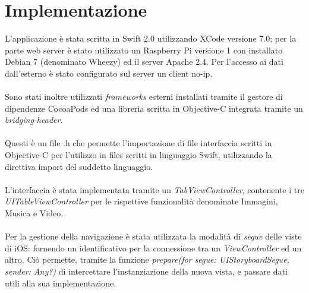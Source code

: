 \section{Implementazione}
L'applicazione è stata scritta in Swift 2.0 utilizzando XCode versione 7.0; per la parte web server è stato utilizzato un Raspberry Pi versione 1 con installato Debian 7 (denominato Wheezy) ed il server Apache 2.4. Per l'accesso ai dati dall'esterno è stato configurato sul server un client no-ip.\\\\
Sono stati inoltre utilizzati \textit{frameworks} esterni installati tramite il gestore di dipendenze CocoaPods ed una libreria scritta in Objective-C integrata tramite un \textit{bridging-header}.\\\\
Questi è un file .h che permette l'importazione di file interfaccia scritti in Objective-C per l'utilizzo in files scritti in linguaggio Swift, utilizzando la direttiva import del suddetto linguaggio.\\\\
L'interfaccia è stata implementata tramite un \textit{TabViewController}, contenente i tre \textit{UITableViewController} per le rispettive funzionalità denominate Immagini, Musica e Video.\\\\
Per la gestione della navigazione è stata utilizzata la modalità di \textit{segue} delle viste di iOS: fornendo un identificativo per la connessione tra un \textit{ViewController} ed un altro. Ciò permette, tramite la funzione \textit{prepare(for segue: UIStoryboardSegue, sender: Any?)} di intercettare l'instanziazione della nuova vista, e passare dati utili alla sua implementazione.\ 
